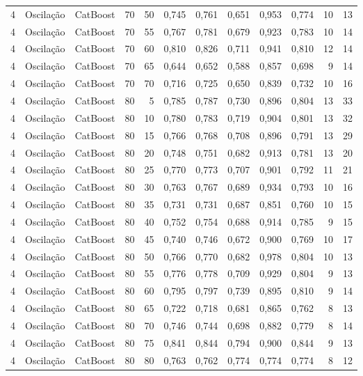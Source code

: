 \begin{longtable}{@{}rllrrrrrrrrr@{}}
4 & Oscilação & CatBoost & 70 & 50 & 0,745 & 0,761 & 0,651 & 0,953 & 0,774 & 10 & 13 \\
4 & Oscilação & CatBoost & 70 & 55 & 0,767 & 0,781 & 0,679 & 0,923 & 0,783 & 10 & 14 \\
4 & Oscilação & CatBoost & 70 & 60 & 0,810 & 0,826 & 0,711 & 0,941 & 0,810 & 12 & 14 \\
4 & Oscilação & CatBoost & 70 & 65 & 0,644 & 0,652 & 0,588 & 0,857 & 0,698 & 9 & 14 \\
4 & Oscilação & CatBoost & 70 & 70 & 0,716 & 0,725 & 0,650 & 0,839 & 0,732 & 10 & 16 \\
4 & Oscilação & CatBoost & 80 & 5 & 0,785 & 0,787 & 0,730 & 0,896 & 0,804 & 13 & 33 \\
4 & Oscilação & CatBoost & 80 & 10 & 0,780 & 0,783 & 0,719 & 0,904 & 0,801 & 13 & 32 \\
4 & Oscilação & CatBoost & 80 & 15 & 0,766 & 0,768 & 0,708 & 0,896 & 0,791 & 13 & 29 \\
4 & Oscilação & CatBoost & 80 & 20 & 0,748 & 0,751 & 0,682 & 0,913 & 0,781 & 13 & 20 \\
4 & Oscilação & CatBoost & 80 & 25 & 0,770 & 0,773 & 0,707 & 0,901 & 0,792 & 11 & 21 \\
4 & Oscilação & CatBoost & 80 & 30 & 0,763 & 0,767 & 0,689 & 0,934 & 0,793 & 10 & 16 \\
4 & Oscilação & CatBoost & 80 & 35 & 0,731 & 0,731 & 0,687 & 0,851 & 0,760 & 10 & 15 \\
4 & Oscilação & CatBoost & 80 & 40 & 0,752 & 0,754 & 0,688 & 0,914 & 0,785 & 9 & 15 \\
4 & Oscilação & CatBoost & 80 & 45 & 0,740 & 0,746 & 0,672 & 0,900 & 0,769 & 10 & 17 \\
4 & Oscilação & CatBoost & 80 & 50 & 0,766 & 0,770 & 0,682 & 0,978 & 0,804 & 10 & 13 \\
4 & Oscilação & CatBoost & 80 & 55 & 0,776 & 0,778 & 0,709 & 0,929 & 0,804 & 9 & 13 \\
4 & Oscilação & CatBoost & 80 & 60 & 0,795 & 0,797 & 0,739 & 0,895 & 0,810 & 9 & 14 \\
4 & Oscilação & CatBoost & 80 & 65 & 0,722 & 0,718 & 0,681 & 0,865 & 0,762 & 8 & 13 \\
4 & Oscilação & CatBoost & 80 & 70 & 0,746 & 0,744 & 0,698 & 0,882 & 0,779 & 8 & 14 \\
4 & Oscilação & CatBoost & 80 & 75 & 0,841 & 0,844 & 0,794 & 0,900 & 0,844 & 9 & 13 \\
4 & Oscilação & CatBoost & 80 & 80 & 0,763 & 0,762 & 0,774 & 0,774 & 0,774 & 8 & 12 \\

\end{longtable}
